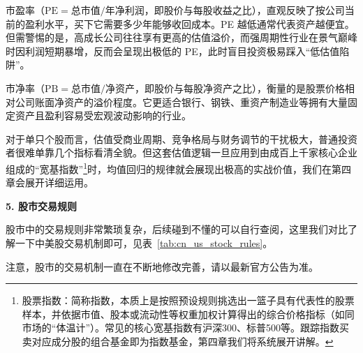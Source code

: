 \documentclass[12pt,openany]{book}
\newcommand{\subhead}[1]{%
    \par\vspace{0.5\baselineskip}%
    \noindent\textbf{#1}\par%
    \vspace{0.5\baselineskip}%
}
\begin{document}
市盈率（$\text{PE} = \text{总市值} / \text{年净利润}$，即股价与每股收益之比），直观反映了按公司当前的盈利水平，买下它需要多少年能够收回成本。PE 越低通常代表资产越便宜。但需警惕的是，高成长公司往往享有更高的估值溢价，而强周期性行业在景气巅峰时因利润短期暴增，反而会呈现出极低的 PE，此时盲目投资极易踩入“低估值陷阱”。

市净率（$\text{PB} = \text{总市值} / \text{净资产}$，即股价与每股净资产之比），衡量的是股票价格相对公司账面净资产的溢价程度。它更适合银行、钢铁、重资产制造业等拥有大量固定资产且盈利容易受宏观波动影响的行业。

对于单只个股而言，估值受商业周期、竞争格局与财务调节的干扰极大，普通投资者很难单靠几个指标看清全貌。但这套估值逻辑一旦应用到由成百上千家核心企业组成的“宽基指数”\footnote{股票指数：简称指数，本质上是按照预设规则挑选出一篮子具有代表性的股票样本，并依据市值、股本或流动性等权重加权计算得出的综合价格指标（如同市场的“体温计”）。常见的核心宽基指数有沪深300、标普500等。跟踪指数买卖对应成分股的组合基金即为指数基金，第四章我们将系统展开讲解。}时，均值回归的规律就会展现出极高的实战价值，我们在第四章会展开详细运用。

\subhead{5. 股市交易规则}

股市中的交易规则非常繁琐复杂，后续碰到不懂的可以自行查阅，这里我们对比了解一下中美股交易机制即可，见表~\ref{tab:cn_us_stock_rules}。

注意，股市的交易机制一直在不断地修改完善，请以最新官方公告为准。
\end{document}
